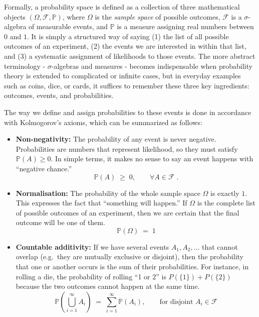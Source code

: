 \documentclass{book}
\begin{document}
\medskip

Formally, a probability space is defined as a collection of three mathematical objects $(\Omega, \mathcal{F}, \mathbb{P})$, where $\Omega$ is the \emph{sample space} of possible outcomes, $\mathcal{F}$ is a $\sigma$-algebra of measurable events, and $\mathbb{P}$ is a measure assigning real numbers between $0$ and $1$. It is simply a structured way of saying (1) the list of all possible outcomes of an experiment, (2) the events we are interested in within that list, and (3) a systematic assignment of likelihoods to those events. The more abstract terminology - $\sigma$-algebras and measures - becomes indispensable when probability theory is extended to complicated or infinite cases, but in everyday examples such as coins, dice, or cards, it suffices to remember these three key ingredients: outcomes, events, and probabilities.

\medskip The way we define and assign probabilities to these events is done in accordance with Kolmogorov’s axioms, which can be summarized as follows:

\begin{itemize}
  \item \textbf{Non-negativity:} The probability of any event is never negative. Probabilities are numbers that represent likelihood, so they must satisfy $\mathbb{P}(A) \geq 0$. In simple terms, it makes no sense to say an event happens with ``negative chance.'' 
\begin{equation}
  	\mathbb{P}(A) \;\geq\; 0, \qquad \forall A \in \mathcal{F} \; .
\end{equation}

  \item \textbf{Normalisation:} The probability of the whole sample space $\Omega$ is exactly $1$. This expresses the fact that ``something will happen.'' If $\Omega$ is the complete list of possible outcomes of an experiment, then we are certain that the final outcome will be one of them.
\begin{equation}
 	\mathbb{P}(\Omega) \;=\; 1
\end{equation}

  \item \textbf{Countable additivity:} If we have several events $A_1, A_2, \ldots$ that cannot overlap (e.g.\ they are mutually exclusive or disjoint), then the probability that one or another occurs is the sum of their probabilities. For instance, in rolling a die, the probability of rolling ``1 or 2'' is $P(\{1\})+P(\{2\})$ because the two outcomes cannot happen at the same time. 
\begin{equation}
 	\mathbb{P}\!\left(\bigcup_{i=1}^\infty A_i\right) \;=\; \sum_{i=1}^\infty \mathbb{P}(A_i),
	\qquad \text{for disjoint } A_i \in \mathcal{F}
\end{equation}

\end{itemize}
\end{document}
